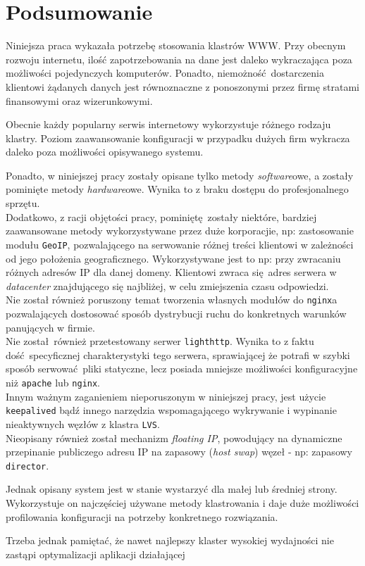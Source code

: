 \chapter*{Podsumowanie}
Niniejsza praca wykazała potrzebę stosowania klastrów WWW.
Przy obecnym rozwoju internetu, ilość zapotrzebowania na dane jest daleko wykraczająca poza możliwości pojedynczych komputerów.
Ponadto, niemożność dostarczenia klientowi żądanych danych jest równoznaczne z ponoszonymi przez firmę stratami finansowymi oraz wizerunkowymi.

Obecnie każdy popularny serwis internetowy wykorzystuje różnego rodzaju klastry.
Poziom zaawansowanie konfiguracji w przypadku dużych firm wykracza daleko poza możliwości opisywanego systemu.

Ponadto, w niniejszej pracy zostały opisane tylko metody \textit{software}owe, a zostały pominięte metody \textit{hardware}owe.
Wynika to z braku dostępu do profesjonalnego sprzętu.\\
Dodatkowo, z racji objętości pracy, pominiętę zostały niektóre, bardziej zaawansowane metody wykorzystywane przez duże korporacjie, np: zastosowanie modułu \texttt{GeoIP}, pozwalającego na serwowanie różnej treści klientowi w zależności od jego położenia geograficznego.
Wykorzystywane jest to np: przy zwracaniu różnych adresów IP dla danej domeny.
Klientowi zwraca się adres serwera w \textit{datacenter} znajdującego się najbliżej, w celu zmiejszenia czasu odpowiedzi.\\
Nie został również poruszony temat tworzenia własnych modułów do \texttt{nginx}a pozwalających dostosować sposób dystrybucji ruchu do konkretnych warunków panujących w firmie.\\
Nie został również przetestowany serwer \texttt{lighthttp}.
Wynika to z faktu dość specyficznej charakterystyki tego serwera, sprawiającej że potrafi w szybki sposób serwować pliki statyczne, lecz posiada mniejsze możliwości konfiguracyjne niż \texttt{apache} lub \texttt{nginx}.\\
Innym ważnym zaganieniem nieporuszonym w niniejszej pracy, jest użycie \texttt{keepalived} bądź innego narzędzia wspomagającego wykrywanie i wypinanie nieaktywnych węzłów z klastra \texttt{LVS}.\\
Nieopisany również został mechanizm \textit{floating IP}, powodujący na dynamiczne przepinanie publiczego adresu IP na zapasowy (\textit{host swap}) węzeł - np: zapasowy \texttt{director}.

Jednak opisany system jest w stanie wystarzyć dla małej lub średniej strony.
Wykorzystuje on najczęściej używane metody klastrowania i daje duże możliwości profilowania konfiguracji na potrzeby konkretnego rozwiązania.

Trzeba jednak pamiętać, że nawet najlepszy klaster wysokiej wydajności nie zastąpi optymalizacji aplikacji działającej 
